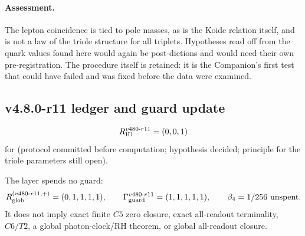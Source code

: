\paragraph{Assessment.}
The lepton coincidence is tied to pole masses, as is the Koide relation itself, and is not a law of the
triole structure for all triplets.  Hypotheses read off from the quark values found here would again be
post-dictions and would need their own pre-registration.  The procedure itself is retained: it is the
Companion's first test that could have failed and was fixed before the data were examined.

\subsection*{v4.8.0-r11 ledger and guard update}
\label{subsec:v480-r11-ledger-guard}

\[
R_{\rm H1}^{v480\text{-}r11}=(0,0,1)
\]
for (protocol committed before computation; hypothesis decided; principle for the triole parameters
still open).

The layer spends no guard:
\[
R_{\rm glob}^{(v480\text{-}r11,+)}=(0,1,1,1,1),
\qquad
\Gamma_{\rm guard}^{v480\text{-}r11}=(1,1,1,1,1),
\qquad
\beta_4=1/256\ \text{unspent}.
\]
It does not imply exact finite \(C5\) zero closure, exact all-readout terminality,
\(C6/T2\), a global photon-clock/RH theorem, or global all-readout closure.

